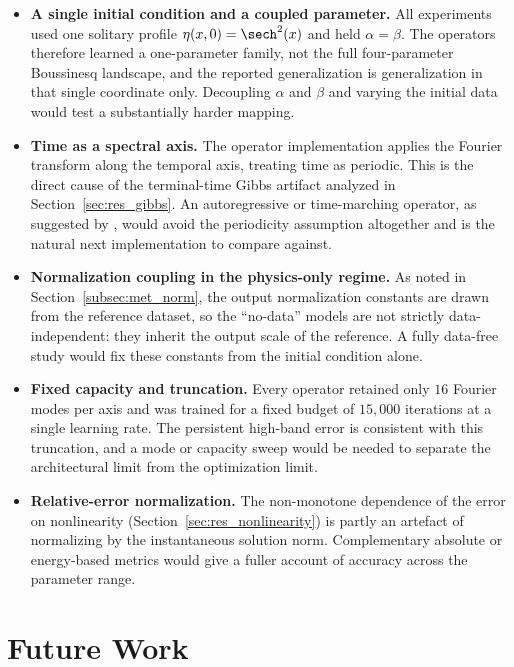 \begin{itemize}
    \item \textbf{A single initial condition and a coupled parameter.} All experiments used one solitary profile $\eta(x,0) = \sech^2(x)$ and held $\alpha = \beta$. The operators therefore learned a one-parameter family, not the full four-parameter Boussinesq landscape, and the reported generalization is generalization in that single coordinate only. Decoupling $\alpha$ and $\beta$ and varying the initial data would test a substantially harder mapping.

    \item \textbf{Time as a spectral axis.} The operator implementation applies the Fourier transform along the temporal axis, treating time as periodic. This is the direct cause of the terminal-time Gibbs artifact analyzed in Section~\ref{sec:res_gibbs}. An autoregressive or time-marching operator, as suggested by \textcite{li2020fourier}, would avoid the periodicity assumption altogether and is the natural next implementation to compare against.

    \item \textbf{Normalization coupling in the physics-only regime.} As noted in Section~\ref{subsec:met_norm}, the output normalization constants are drawn from the reference dataset, so the ``no-data'' models are not strictly data-independent: they inherit the output scale of the reference. A fully data-free study would fix these constants from the initial condition alone.

    \item \textbf{Fixed capacity and truncation.} Every operator retained only $16$ Fourier modes per axis and was trained for a fixed budget of $15{,}000$ iterations at a single learning rate. The persistent high-band error is consistent with this truncation, and a mode or capacity sweep would be needed to separate the architectural limit from the optimization limit.

    \item \textbf{Relative-error normalization.} The non-monotone dependence of the error on nonlinearity (Section~\ref{sec:res_nonlinearity}) is partly an artefact of normalizing by the instantaneous solution norm. Complementary absolute or energy-based metrics would give a fuller account of accuracy across the parameter range.
\end{itemize}

\section{Future Work}

